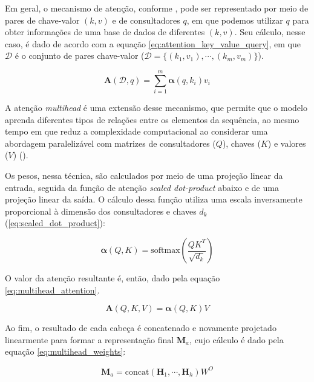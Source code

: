 Em geral, o mecanismo de atenção, conforme \citet{zhang2023dive}, pode ser representado por meio de pares de chave-valor $(k, v)$ e de consultadores $q$, em que podemos utilizar $q$ para obter informações de uma base de dados de diferentes $(k, v)$. Seu cálculo, nesse caso, é dado de acordo com a equação \ref{eq:attention_key_value_query}, em que $\mathcal{D}$ é o conjunto de pares chave-valor ($\mathcal{D} = \{(k_{1}, v_{1}), \cdots, (k_{m}, v_{m})\}$).

\begin{equation}
    \label{eq:attention_key_value_query}
    \boldsymbol{A}(\mathcal{D}, q) = \sum_{i=1}^{m} \boldsymbol{\alpha}(q, k_{i}) v_{i}
\end{equation}

A atenção \textit{multihead} é uma extensão desse mecanismo, que permite que o modelo aprenda diferentes tipos de relações entre os elementos da sequência, ao mesmo tempo em que reduz a complexidade computacional ao considerar uma abordagem paralelizável com matrizes de consultadores ($Q$), chaves ($K$) e valores ($V$) (\cite{attention2017}).

Os pesos, nessa técnica, são calculados por meio de uma projeção linear da entrada, seguida da função de atenção \textit{scaled dot-product} abaixo e de uma projeção linear da saída. O cálculo dessa função utiliza uma escala inversamente proporcional à dimensão dos consultadores e chaves $d_{k}$ (\ref{eq:scaled_dot_product}):

\begin{equation}
    \label{eq:scaled_dot_product}
    \boldsymbol{\alpha}(Q, K) = \text{softmax} \left( \frac{QK^{T}}{\sqrt{d_{k}}} \right)
\end{equation}

O valor da atenção resultante é, então, dado pela equação \ref{eq:multihead_attention}.

\begin{equation}
    \label{eq:multihead_attention}
    \boldsymbol{A}(Q, K, V) = \boldsymbol{\alpha}(Q, K)V
\end{equation}

Ao fim, o resultado de cada cabeça é concatenado e novamente projetado linearmente para formar a representação final $\boldsymbol{M}_{a}$, cujo cálculo é dado pela equação \ref{eq:multihead_weights}:

\begin{equation}
    \label{eq:multihead_weights}
    \boldsymbol{M}_{a} = \text{concat}(\boldsymbol{H}_{1}, \cdots, \boldsymbol{H}_{h})W^{O}
\end{equation}

